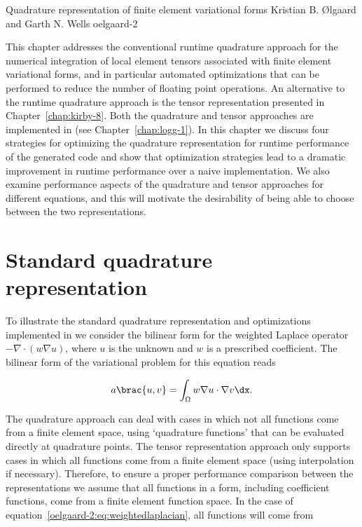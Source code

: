               {Quadrature representation of finite element variational forms}
              {Kristian B. \O{}lgaard and Garth N. Wells}
              {oelgaard-2}

This chapter addresses the conventional runtime quadrature approach
for the numerical integration of local element tensors associated with
finite element variational forms, and in particular automated
optimizations that can be performed to reduce the number of floating
point operations.  An alternative to the runtime quadrature approach
is the tensor representation presented in Chapter~\ref{chap:kirby-8}.
Both the quadrature and tensor approaches are implemented in \ffc{}
(see Chapter~\ref{chap:logg-1}).  In this chapter we discuss four
strategies for optimizing the quadrature representation for runtime
performance of the generated code and show that optimization
strategies lead to a dramatic improvement in runtime performance over
a naive implementation.  We also examine performance aspects of the
quadrature and tensor approaches for different equations, and this
will motivate the desirability of being able to choose between the two
representations.

\section{Standard quadrature representation}
\label{oelgaard-2:sec:standard_quadrature_representation}

To illustrate the standard quadrature representation  and optimizations implemented in \ffc{} we consider
the bilinear form for the weighted Laplace operator $-\nabla \cdot (w
\nabla u)$, where $u$ is the unknown and $w$ is a prescribed
coefficient.  The bilinear form of the variational problem for this
equation reads

\begin{equation}
  a\brac{u, v} = \int_{\Omega} w \nabla u \cdot \nabla v \dx.
  \label{oelgaard-2:eq:weightedlaplacian}
\end{equation}

The quadrature approach can deal with cases in which not all functions
come from a finite element space, using `quadrature functions' that
can be evaluated directly at quadrature points. The tensor
representation approach only supports cases in which all functions
come from a finite element space (using interpolation if necessary).
Therefore, to ensure a proper performance comparison between the
representations we assume that all functions in a form, including
coefficient functions, come from a finite element function space. In
the case of equation~\eqref{oelgaard-2:eq:weightedlaplacian}, all
functions will come from


